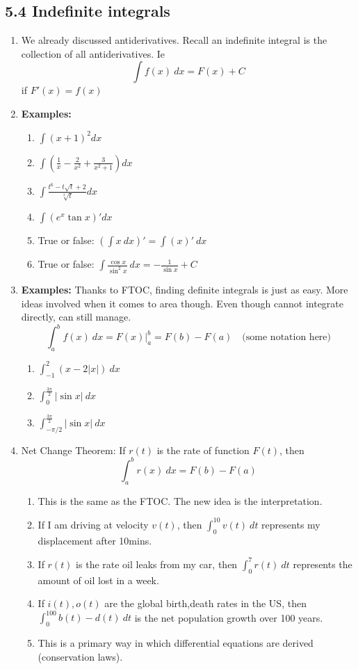 \documentclass{article}
\newcommand{\ds}{\displaystyle}
\begin{document}
\subsection{5.4 Indefinite integrals}
\begin{enumerate}
\item We already discussed antiderivatives. Recall an indefinite integral is the collection of all antiderivatives. Ie
$$
\int f(x) ~dx = F(x) + C
$$
if $F'(x) = f(x)$

\item {\bf Examples:}
\begin{enumerate}
\item $\ds \int (x+1)^2dx$
\item $\ds \int (\frac{1}{x}-\frac{2}{x^2}+\frac{3}{x^2+1})dx$
\item $\ds \int \frac{t^6-t\sqrt{t}+2}{\sqrt[3]{t}}dx$
\item $\ds \int (e^x\tan x)'dx$
\item True or false: $\ds (\int x ~dx)' = \int (x)'~dx$
\item True or false: $\ds \int \frac{\cos x}{\sin^2 x}~dx = -\frac{1}{\sin x}+C$
\end{enumerate}

\item {\bf Examples:} Thanks to FTOC, finding definite integrals is just as easy. More ideas involved when it comes to area though. Even though cannot integrate directly, can still manage.
$$
\int_a^b f(x) ~dx  = F(x)\Big|_a^b = F(b)-F(a) \quad \text{(some notation here)}
$$
\begin{enumerate}
\item $\ds \int_{-1}^2 (x-2|x|)~dx$
\item $\int_{0}^\frac{3\pi}{2} |\sin x|~dx$
\item $\int_{-\pi/2}^\frac{3\pi}{2} |\sin x|~dx$
\end{enumerate}

\item Net Change Theorem: If $r(t)$ is the rate of function $F(t)$, then
$$
\int_a^b r(x)~dx = F(b)-F(a)
$$
\begin{enumerate}
\item This is the same as the FTOC. The new idea is the interpretation.
\item If I am driving at velocity $v(t)$, then $\ds \int_0^10 v(t)~dt$ represents my displacement after 10mins.
\item If $r(t)$ is the rate oil leaks from my car, then $\ds \int_0^7 r(t)~dt$ represents the amount of oil lost in a week.
\item If $i(t),o(t)$ are the global birth,death rates in the US, then $\int_0^100 b(t)-d(t)~dt$ is the net population growth over 100 years.
\item This is a primary way in which differential equations are derived (conservation laws).
\end{enumerate}
\end{enumerate}
\end{document}
